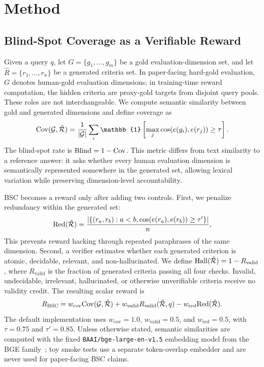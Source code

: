 \section{Method}

\subsection{Blind-Spot Coverage as a Verifiable Reward}

Given a query $q$, let $G=\{g_1,\dots,g_m\}$ be a gold
evaluation-dimension set, and let $\hat{R}=\{r_1,\dots,r_n\}$ be a generated
criteria set. In paper-facing hard-gold evaluation, $G$ denotes human-gold
evaluation dimensions; in training-time reward computation, the hidden
criteria are proxy-gold targets from disjoint query pools. These roles are not
interchangeable. We
compute semantic similarity between gold and generated dimensions and define
coverage as
\[
\cov(\gold,\pred) = \frac{1}{|\gold|}\sum_i
\mathbb{1}\left[\max_j \cos(e(g_i), e(r_j)) \ge \tau\right].
\]
The blind-spot rate is $\mathrm{Blind} = 1-\mathrm{Cov}$. This metric differs from text
similarity to a reference answer: it asks whether every human evaluation
dimension is semantically represented somewhere in the generated set, allowing
lexical variation while preserving dimension-level accountability.

BSC becomes a reward only after adding two controls. First, we penalize
redundancy within the generated set:
\[
\mathrm{Red}(\hat{\mathcal{R}}) =
\frac{|\{(r_a,r_b): a<b, \cos(e(r_a), e(r_b)) \ge \tau'\}|}{n},
\]
This prevents reward hacking through repeated paraphrases of the same
dimension. Second, a verifier estimates whether each generated criterion is
atomic, decidable, relevant, and non-hallucinated. We define
$\mathrm{Hall}(\hat{\mathcal{R}})=1-R_{\mathrm{valid}}$, where $R_{\mathrm{valid}}$ is the
fraction of generated criteria passing all four checks. Invalid,
undecidable, irrelevant, hallucinated, or otherwise unverifiable criteria
receive no validity credit. The resulting scalar reward is
\[
R_{\mathrm{BSC}} =
w_{\mathrm{cov}}\mathrm{Cov}(\mathcal{G},\hat{\mathcal{R}})
+ w_{\mathrm{valid}}R_{\mathrm{valid}}(\hat{\mathcal{R}},q)
- w_{\mathrm{red}}\mathrm{Red}(\hat{\mathcal{R}}).
\]
The default implementation uses $w_{\mathrm{cov}}=1.0$,
$w_{\mathrm{valid}}=0.5$, and $w_{\mathrm{red}}=0.5$, with
$\tau=0.75$ and $\tau'=0.85$. Unless otherwise stated, semantic similarities
are computed with the fixed \texttt{BAAI/bge-large-en-v1.5} embedding model
from the BGE family~\cite{xiao2023cpack}; toy smoke tests use a separate
token-overlap embedder and are never used for paper-facing BSC claims.

